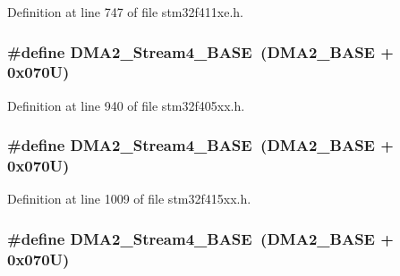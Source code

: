 Definition at line 747 of file stm32f411xe.\+h.

\subsubsection[{\texorpdfstring{D\+M\+A2\+\_\+\+Stream4\+\_\+\+B\+A\+SE}{DMA2_Stream4_BASE}}]{\setlength{\rightskip}{0pt plus 5cm}\#define D\+M\+A2\+\_\+\+Stream4\+\_\+\+B\+A\+SE~({\bf D\+M\+A2\+\_\+\+B\+A\+SE} + 0x070\+U)}\hypertarget{group___peripheral__registers__structures_gad1e67740e6301233473f64638145dd1f}{}\label{group___peripheral__registers__structures_gad1e67740e6301233473f64638145dd1f}


Definition at line 940 of file stm32f405xx.\+h.

\subsubsection[{\texorpdfstring{D\+M\+A2\+\_\+\+Stream4\+\_\+\+B\+A\+SE}{DMA2_Stream4_BASE}}]{\setlength{\rightskip}{0pt plus 5cm}\#define D\+M\+A2\+\_\+\+Stream4\+\_\+\+B\+A\+SE~({\bf D\+M\+A2\+\_\+\+B\+A\+SE} + 0x070\+U)}\hypertarget{group___peripheral__registers__structures_gad1e67740e6301233473f64638145dd1f}{}\label{group___peripheral__registers__structures_gad1e67740e6301233473f64638145dd1f}


Definition at line 1009 of file stm32f415xx.\+h.

\subsubsection[{\texorpdfstring{D\+M\+A2\+\_\+\+Stream4\+\_\+\+B\+A\+SE}{DMA2_Stream4_BASE}}]{\setlength{\rightskip}{0pt plus 5cm}\#define D\+M\+A2\+\_\+\+Stream4\+\_\+\+B\+A\+SE~({\bf D\+M\+A2\+\_\+\+B\+A\+SE} + 0x070\+U)}\hypertarget{group___peripheral__registers__structures_gad1e67740e6301233473f64638145dd1f}{}\label{group___peripheral__registers__structures_gad1e67740e6301233473f64638145dd1f}


